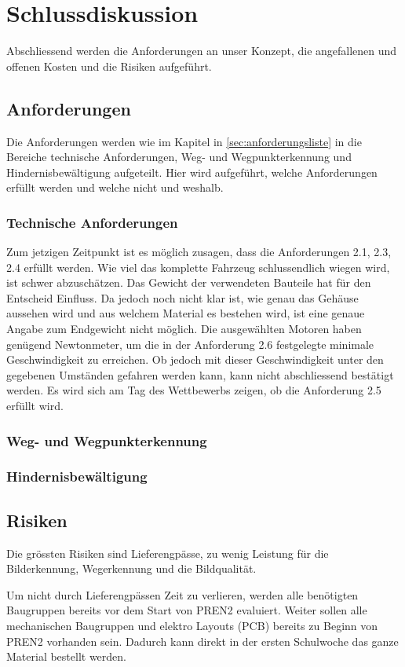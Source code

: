 \documentclass[../main.tex]{subfiles}
\begin{document}
\newpage
\section{Schlussdiskussion}

Abschliessend werden die Anforderungen an unser Konzept, die angefallenen und offenen Kosten und die Risiken aufgeführt. 
\subsection{Anforderungen}
Die Anforderungen werden wie im Kapitel in \ref{sec:anforderungsliste} in die Bereiche technische Anforderungen, Weg- und Wegpunkterkennung und Hindernisbewältigung aufgeteilt. Hier wird aufgeführt, welche Anforderungen erfüllt werden und welche nicht und weshalb.
\subsubsection{Technische Anforderungen}
Zum jetzigen Zeitpunkt ist es möglich zusagen, dass die Anforderungen 2.1, 2.3, 2.4 erfüllt werden. Wie viel das komplette Fahrzeug schlussendlich wiegen wird, ist schwer abzuschätzen. Das Gewicht der verwendeten Bauteile hat für den Entscheid Einfluss. Da jedoch noch nicht klar ist, wie genau das Gehäuse aussehen wird und aus welchem Material es bestehen wird, ist eine genaue Angabe zum Endgewicht nicht möglich. Die ausgewählten Motoren haben genügend Newtonmeter, um die in der Anforderung 2.6 festgelegte minimale Geschwindigkeit zu erreichen. Ob jedoch mit dieser Geschwindigkeit unter den gegebenen Umständen gefahren werden kann, kann nicht abschliessend bestätigt werden.
Es wird sich am Tag des Wettbewerbs zeigen, ob die Anforderung 2.5 erfüllt wird.
\subsubsection{Weg- und Wegpunkterkennung}

\subsubsection{Hindernisbewältigung}
\subsection{Risiken}
Die grössten Risiken sind Lieferengpässe, zu wenig Leistung für die Bilderkennung, Wegerkennung und die Bildqualität. 

Um nicht durch Lieferengpässen Zeit zu verlieren, werden alle benötigten Baugruppen bereits vor dem Start von PREN2 evaluiert. Weiter sollen alle mechanischen Baugruppen und elektro Layouts (PCB) bereits zu Beginn von PREN2 vorhanden sein. Dadurch kann direkt in der ersten Schulwoche das ganze Material bestellt werden.
\end{document}
